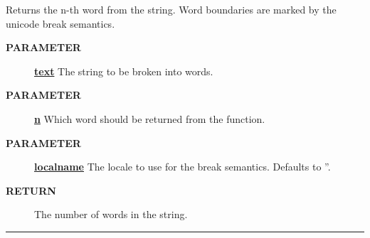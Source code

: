 \par
Returns the n-th word from the string. Word boundaries are marked by the unicode break semantics.

\par
\begin{description}
\item [\colorbox{tagtype}{\color{white} \textbf{\textsf{PARAMETER}}}] \textbf{\underline{text}} The string to be broken into words.
\item [\colorbox{tagtype}{\color{white} \textbf{\textsf{PARAMETER}}}] \textbf{\underline{n}} Which word should be returned from the function.
\item [\colorbox{tagtype}{\color{white} \textbf{\textsf{PARAMETER}}}] \textbf{\underline{localname}} The locale to use for the break semantics. Defaults to ''.
\item [\colorbox{tagtype}{\color{white} \textbf{\textsf{RETURN}}}] \textbf{\underline{}} The number of words in the string.
\end{description}

\rule{\linewidth}{0.5pt}


